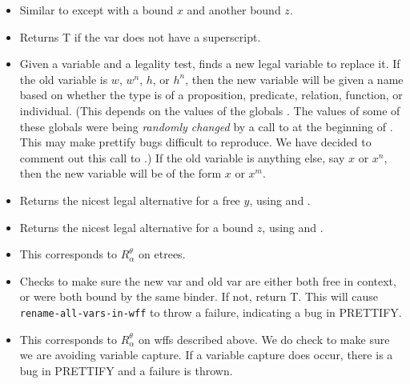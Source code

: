 \begin{itemize}
\item {\bf {}}  Similar to {\bf {}}
except with a bound $x$ and another bound $z$.
\item {\bf {}}  Returns T if the var does not have a superscript.
\item {\bf {}}  Given a variable and a legality test, finds
a new legal variable to replace it.
If the old variable is
$w$, $w^n$, $h$, or $h^n$, then the new variable will be given a name
based on whether the type is of a proposition, predicate, relation, function, or individual.
(This depends on the values of the globals 
{\tt {}}
{\tt {}}
{\tt {}}
{\tt {}}
{\tt {}}.
The values of some of these globals were being
{\it randomly changed} by a call to 
at the beginning of {\bf{}}.
This may make prettify bugs difficult to reproduce.
We have decided to comment out this call to .)
If the old variable is anything else, say $x$ or $x^n$, then the new
variable will be of the form $x$ or $x^m$.
\item {\bf {}}  Returns the nicest legal alternative for a free $y$,
using {\bf {}} and {\bf {}}.
\item {\bf {}} Returns the nicest legal alternative for a bound $z$,
using {\bf {}} and {\bf {}}.
\item {\bf {}}  This corresponds to $R^\theta_\alpha$ on etrees.
\item {\bf {}}  Checks to make sure the new var and old
var are either both free in context, or were both bound by the same binder.  If not, return T.
This will cause \verb+rename-all-vars-in-wff+ to throw a failure, indicating a bug in PRETTIFY.
\item {\bf {}}  This corresponds to $R^\theta_\alpha$
on wffs described above.  We do check to make sure we are avoiding variable capture. 
If a variable capture does occur, there is a bug in PRETTIFY and a failure is thrown.
\end{itemize}

